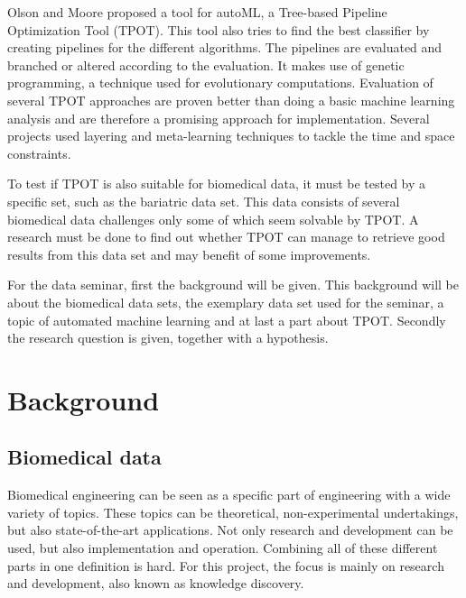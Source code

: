 \documentclass[10pt,a4paper]{article}
\begin{document}
	Olson and Moore proposed a tool for autoML, a Tree-based Pipeline Optimization Tool (TPOT).\cite{olson2016tpot} This tool also tries to find the best classifier by creating pipelines for the different algorithms. The pipelines are evaluated and branched or altered according to the evaluation. It makes use of genetic programming, a technique used for evolutionary computations.\cite{banzhaf1998genetic} Evaluation of several TPOT approaches are proven better than doing a basic machine learning analysis and are therefore a promising approach for implementation.\cite{olson2016evaluation} Several projects used layering and meta-learning techniques to tackle the time and space constraints.\cite{Gijsbers2017Thesis}
	
	To test if TPOT is also suitable for biomedical data, it must be tested by a specific set, such as the bariatric data set. This data consists of several biomedical data challenges only some of which seem solvable by TPOT. A research must be done to find out whether TPOT can manage to retrieve good results from this data set and may benefit of some improvements.
	
	For the data seminar, first the background will be given. This background will be about the biomedical data sets, the exemplary data set used for the seminar, a topic of automated machine learning and at last a part about TPOT. Secondly the research question is given, together with a hypothesis.
	
	\section{Background}
	\label{sec:Background}
	
	\subsection{Biomedical data}
	
	\label{subsec:BiomedicalData}
	
	Biomedical engineering can be seen as a specific part of engineering with a wide variety of topics. These topics can be theoretical, non-experimental undertakings, but also state-of-the-art applications. Not only research and development can be used, but also implementation and operation. Combining all of these different parts in one definition is hard.\cite{bronzino2014biomedical} For this project, the focus is mainly on research and development, also known as knowledge discovery.\cite{bramer2007principles} 
\end{document}
